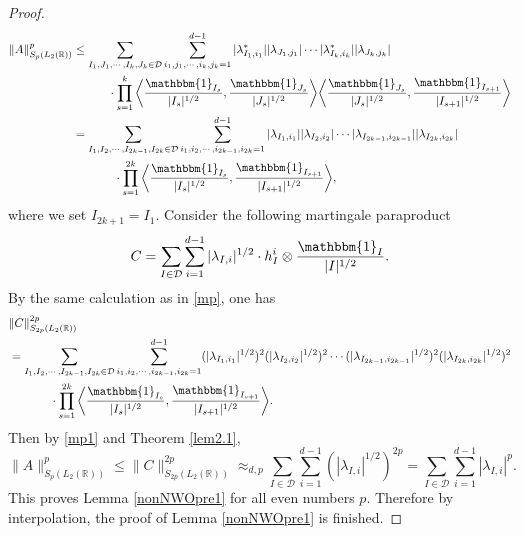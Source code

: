\documentclass[oneside,english,a4wide]{amsart}
\numberwithin{equation}{section}
\numberwithin{figure}{section}
\theoremstyle{plain}
\theoremstyle{plain}
\theoremstyle{definition}
\theoremstyle{plain}
\theoremstyle{remark}
\theoremstyle{definition}
\theoremstyle{remark}
\theoremstyle{definition}
\newcommand{\8}{\infty}
\begin{document}
\begin{proof}
	\begin{equation}\label{mp1}
		\begin{aligned}
			\|A\|^p_{S_p(L_2(\mathbb{R}))}
			&\leq \sum_{I_1,J_1,\cdots,I_k,J_k\in\mathcal{D}}\sum_{ i_1,j_1,\cdots,i_k,j_k=1}^{d-1} |\lambda_{I_1,i_1}^*| |\lambda_{J_1,j_1}|\cdots |\lambda_{I_k,i_k}^*| |\lambda_{J_k,j_k}|\\
			&\quad\quad\quad \cdot\prod_{s=1}^k \bigg\langle \frac{\mathbbm{1}_{I_s}}{|I_s|^{1/2}},\frac{\mathbbm{1}_{J_s}}{|J_s|^{1/2}}\bigg\rangle \bigg\langle \frac{\mathbbm{1}_{J_s}}{|J_s|^{1/2}},\frac{\mathbbm{1}_{I_{s+1}}}{|I_{s+1}|^{1/2}}\bigg\rangle\\
			&=\sum_{I_1,I_2,\cdots,I_{2k-1},I_{2k}\in\mathcal{D}}\sum_{i_1,i_2,\cdots,i_{2k-1},i_{2k}=1}^{d-1} |\lambda_{I_1,i_1}| |\lambda_{I_2,i_2}|\cdots |\lambda_{I_{2k-1},i_{2k-1}}| |\lambda_{I_{2k},i_{2k}}| \\
			&\quad\quad\quad\,\,\,\cdot\prod_{s=1}^{2k} \bigg\langle \frac{\mathbbm{1}_{I_s}}{|I_s|^{1/2}},\frac{\mathbbm{1}_{I_{s+1}}}{|I_{s+1}|^{1/2}}\bigg\rangle, 
		\end{aligned}
	\end{equation}
	where we set $I_{2k+1}=I_1$. Consider the following martingale paraproduct
	$$  C= \sum_{I\in \mathcal{D}}\sum_{i=1}^{d-1}|\lambda_{I,i}|^{1/2}\cdot h_I^i\otimes\frac{\mathbbm{1}_{I}}{|I|^{1/2}}. $$
	By the same calculation as in \eqref{mp}, one has
	\begin{equation*}
		\begin{aligned}
			&\|C\|^{2p}_{S_{2p}(L_2(\mathbb{R}))}\\
			&=\sum_{I_1,I_2,\cdots,I_{2k-1},I_{2k}\in\mathcal{D}}\sum_{i_1,i_2,\cdots,i_{2k-1},i_{2k}=1}^{d-1} (|\lambda_{I_1,i_1}|^{1/2})^2 (|\lambda_{I_2,i_2}|^{1/2})^2\cdots (|\lambda_{I_{2k-1},i_{2k-1}}|^{1/2})^2 (|\lambda_{I_{2k},i_{2k}}|^{1/2})^2\\
			&\quad\quad\quad\,\,\, \cdot \prod_{s=1}^{2k} \bigg\langle \frac{\mathbbm{1}_{I_s}}{|I_s|^{1/2}},\frac{\mathbbm{1}_{I_{s+1}}}{|I_{s+1}|^{1/2}}\bigg\rangle.
		\end{aligned}
	\end{equation*}
	Then by \eqref{mp1} and Theorem \ref{lem2.1},
	$$ \|A\|^p_{S_p(L_2(\mathbb{R}))}\leq \|C\|^{2p}_{S_{2p}(L_2(\mathbb{R}))} \approx_{d, p} \sum_{I\in\mathcal{D}}\sum_{i=1}^{d-1}(|\lambda_{I,i}|^{1/2})^{2p}=\sum_{I\in\mathcal{D}}\sum_{i=1}^{d-1}|\lambda_{I,i}|^p.  $$
	This proves Lemma \ref{nonNWOpre1} for all even numbers $p$. Therefore by interpolation, the proof of Lemma \ref{nonNWOpre1} is finished.
\end{proof}
\end{document}
